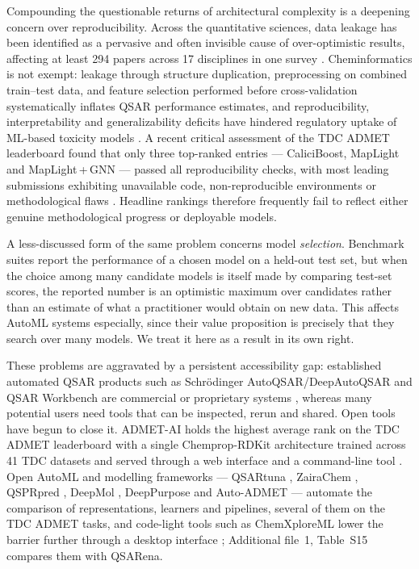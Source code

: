 Compounding the questionable returns of architectural complexity is a deepening concern over reproducibility. Across the quantitative sciences, data leakage has been identified as a pervasive and often invisible cause of over-optimistic results, affecting at least 294 papers across 17 disciplines in one survey \cite{kapoor2023leakage}. Cheminformatics is not exempt: leakage through structure duplication, preprocessing on combined train--test data, and feature selection performed before cross-validation systematically inflates QSAR performance estimates, and reproducibility, interpretability and generalizability deficits have hindered regulatory uptake of ML-based toxicity models \cite{belfield2023guidance}. A recent critical assessment of the TDC ADMET leaderboard found that only three top-ranked entries --- CaliciBoost, MapLight and MapLight\,+\,GNN --- passed all reproducibility checks, with most leading submissions exhibiting unavailable code, non-reproducible environments or methodological flaws \cite{koleiev2026critical}. Headline rankings therefore frequently fail to reflect either genuine methodological progress or deployable models.

A less-discussed form of the same problem concerns model \emph{selection}. Benchmark suites report the performance of a chosen model on a held-out test set, but when the choice among many candidate models is itself made by comparing test-set scores, the reported number is an optimistic maximum over candidates rather than an estimate of what a practitioner would obtain on new data. This affects AutoML systems especially, since their value proposition is precisely that they search over many models. We treat it here as a result in its own right.

These problems are aggravated by a persistent accessibility gap: established automated QSAR products such as Schr\"odinger AutoQSAR/DeepAutoQSAR and QSAR Workbench are commercial or proprietary systems \cite{dixon2016autoqsar,schrodinger2024deepautoqsar,cox2013qsarworkbench}, whereas many potential users need tools that can be inspected, rerun and shared. Open tools have begun to close it. ADMET-AI holds the highest average rank on the TDC ADMET leaderboard with a single Chemprop-RDKit architecture trained across 41 TDC datasets and served through a web interface and a command-line tool \cite{swanson2024admetai}. Open AutoML and modelling frameworks --- QSARtuna \cite{mervin2024qsartuna}, ZairaChem \cite{turon2023zairachem}, QSPRpred \cite{maagdenberg2024qsprpred}, DeepMol \cite{correia2024deepmol}, DeepPurpose \cite{huang2020deeppurpose} and Auto-ADMET \cite{desa2025autoadmet} --- automate the comparison of representations, learners and pipelines, several of them on the TDC ADMET tasks, and code-light tools such as ChemXploreML lower the barrier further through a desktop interface \cite{marimuthu2025chemxploreml}; Additional file~1, Table~S15 compares them with QSARena.

